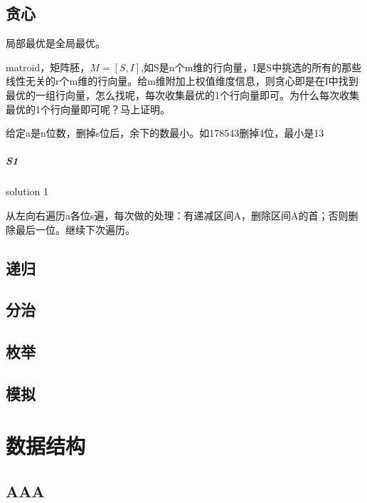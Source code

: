 \documentclass[UTF8]{../computerUniverse}
\begin{document}
\section{贪心}

局部最优是全局最优。



matroid，矩阵胚，$M = [S,I]$,如S是n个m维的行向量，I是S中挑选的所有的那些线性无关的r个m维的行向量。给m维附加上权值维度信息，则贪心即是在I中找到最优的一组行向量，怎么找呢，每次收集最优的1个行向量即可。为什么每次收集最优的1个行向量即可呢？马上证明。

\begin{question}
  给定a是n位数，删掉s位后，余下的数最小。如178543删掉4位，最小是13
 
   \paragraph{S1} solution 1

   从左向右遍历a各位s遍，每次做的处理：有递减区间A，删除区间A的首；否则删除最后一位。继续下次遍历。

 
 \end{question}

\section{递归}

\section{分治}

\section{枚举}

\section{模拟}





\chapter{数据结构}

\section{AAA}
\end{document}
